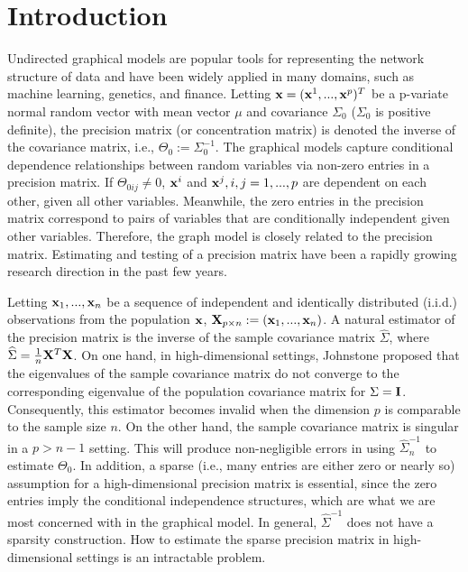 \documentclass[review]{elsarticle}
\newcommand{\bbx}{{\bf x}}
\newcommand{\bbX}{{\bf X}}
\newcommand{\bbI}{{\bf I}}
\newcommand{\1}{{\bf 1}}
\newcommand{\0}{{\bf 0}}
\begin{document}
\section{Introduction}
 Undirected graphical models are popular tools for representing the network structure of data and have been widely applied in many domains, such as machine learning, genetics, and finance.
 Letting $\bbx=(\bbx^{1},...,\bbx^{p})^{T}$ be a p-variate normal random vector with mean vector $\mu$ and covariance $\Sigma_0$ ($\Sigma_0$ is positive definite),
 the precision matrix (or concentration matrix) is denoted the inverse of the covariance matrix, i.e., $\Theta_0:=\Sigma_0^{-1}$.
 The graphical models capture conditional dependence relationships between random variables via non-zero entries in a precision matrix.
 If $\Theta_{0ij}\neq 0$, $\bbx^{i}$ and $\bbx^{j}, i,j=1,...,p$ are dependent on each other, given all other variables.
 Meanwhile, the zero entries in the precision matrix correspond to pairs of variables that are conditionally independent given other variables.
 Therefore, the graph model is closely related to the precision matrix.
 Estimating and testing of a precision matrix have been a rapidly growing research direction in the past few years.

 Letting $\bbx_1,...,\bbx_n$ be a sequence of independent and identically distributed (i.i.d.) observations from the population $\bbx$, $\bbX_{p\times n}:=(\bbx_1,...,\bbx_n)$.
 A natural estimator of the precision matrix is the inverse of the sample covariance matrix $\widehat\Sigma$, where $\widehat\Sigma=\frac{1}{n}\bbX^{T}\bbX$.
 On one hand, in high-dimensional settings, Johnstone \cite{johnstone2001distribution} proposed that the eigenvalues of the sample covariance matrix do not converge to the corresponding eigenvalue of the population covariance matrix for $\Sigma=\bbI$.
 Consequently, this estimator becomes invalid when the dimension $p$ is comparable to the sample size $n$.
 On the other hand, the sample covariance matrix is singular in a $p>n-1$ setting.
 This will produce non-negligible errors in using $\widehat\Sigma_n^{-1}$ to estimate $\Theta_0$.
 In addition, a sparse (i.e., many entries are either zero or nearly so) assumption for a high-dimensional precision matrix is essential, since the zero entries imply the conditional independence structures, which are what we are most concerned with in the graphical model.
 In general, $\widehat\Sigma^{-1}$ does not have a sparsity construction.
 How to estimate the sparse precision matrix in high-dimensional settings is an intractable problem.
\end{document}
